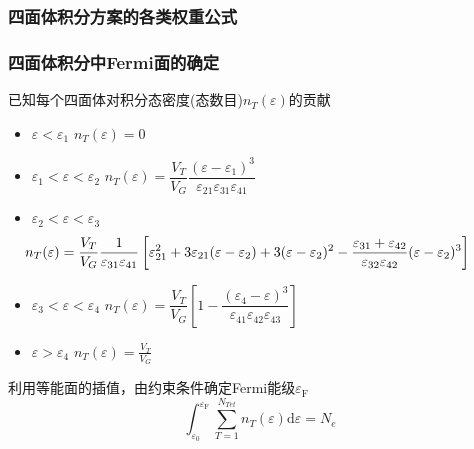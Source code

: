{\subsubsection{四面体积分方案的各类权重公式}
\frame
{
	\frametitle{四面体积分中\textrm{Fermi}面的确定}
	已知每个四面体对积分态密度(态数目)$n_T(\varepsilon)$的贡献
	\begin{itemize}
	\item $\varepsilon<\varepsilon_1$
		\:	$n_T(\varepsilon)=0$
	\item $\varepsilon_1<\varepsilon<\varepsilon_2$
		\:	$n_T(\varepsilon)=\dfrac{V_T}{V_G}\dfrac{(\varepsilon-\varepsilon_1)^3}{\varepsilon_{21}\varepsilon_{31}\varepsilon_{41}}$
	\item $\varepsilon_2<\varepsilon<\varepsilon_3$
		\begin{displaymath}
			\hspace*{-35pt}	n_T(\varepsilon)=\dfrac{V_T}{V_G}\dfrac1{\varepsilon_{31}\varepsilon_{41}}\left[\varepsilon_{21}^2+3\varepsilon_{21}(\varepsilon-\varepsilon_2)+3(\varepsilon-\varepsilon_2)^2-\dfrac{\varepsilon_{31}+\varepsilon_{42}}{\varepsilon_{32}\varepsilon_{42}}(\varepsilon-\varepsilon_2)^3\right]
		\end{displaymath}
	\item $\varepsilon_3<\varepsilon<\varepsilon_4$
		\:	$n_T(\varepsilon)=\dfrac{V_T}{V_G}\left[1-\dfrac{(\varepsilon_4-\varepsilon)^3}{\varepsilon_{41}\varepsilon_{42}\varepsilon_{43}}\right]$
	\item $\varepsilon>\varepsilon_4$
		\:	$n_T(\varepsilon)=\frac{V_T}{V_G}$
	\end{itemize}
	利用等能面的插值，由约束条件确定\textrm{Fermi}能级$\varepsilon_{\mathrm F}$
	$$\int_{\varepsilon_0}^{\varepsilon_{\mathrm F}}\sum_{T=1}^{N_{Tet}}n_T(\varepsilon)\mathrm{d}\varepsilon=N_e$$
}

}

